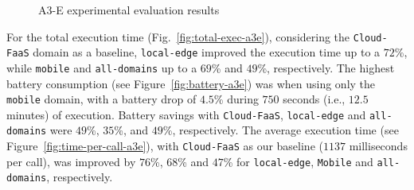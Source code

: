 \begin{figure}[htb]
	\raggedright
	\captionsetup[subfigure]{width=0.33\textwidth}	
	\captionsetup[subfigure]{width=0.33\textwidth}
	\captionsetup[subfigure]{width=0.33\textwidth}
	
	\caption{A3-E experimental evaluation results} \label{fig:exp-a3e}
\end{figure}


For the total execution time (Fig.~\ref{fig:total-exec-a3e}), considering the \texttt{Cloud-FaaS} domain as a baseline, \texttt{local-edge} improved the execution time up to a $72$\%, while \texttt{mobile} and \texttt{all-domains} up to a $69$\% and $49$\%, respectively. The highest battery consumption (see Figure~\ref{fig:battery-a3e}) was when using only the \texttt{mobile} domain, with a battery drop of $4.5$\% during $750$ seconds (i.e., $12.5$ minutes) of execution. Battery savings with \texttt{Cloud-FaaS}, \texttt{local-edge} and \texttt{all-domains} were $49$\%, $35$\%, and $49$\%, respectively. The average execution time (see Figure~\ref{fig:time-per-call-a3e}), with \texttt{Cloud-FaaS} as our baseline ($1137$ milliseconds per call), was improved by $76$\%, $68$\% and $47$\% for \texttt{local-edge}, \texttt{Mobile} and \texttt{all-domains}, respectively. 

